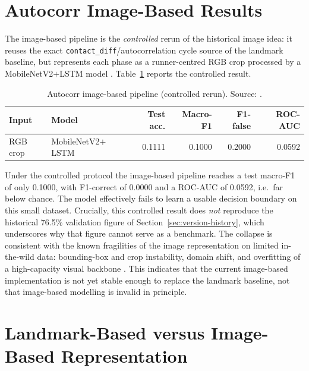 \section{Autocorr Image-Based Results}
\label{sec:image-results}

The image-based pipeline is the \emph{controlled} rerun of the historical
image idea: it reuses the exact \texttt{contact\_diff}/autocorrelation cycle
source of the landmark baseline, but represents each phase as a runner-centred
RGB crop processed by a MobileNetV2$+$LSTM model \cite{sandler2018mobilenetv2,hochreiter1997lstm,donahue2015lrcn}. Table~\ref{tab:image}
reports the controlled result.

\begin{table}[htbp]
\centering
\caption[Autocorr image-based pipeline results. Source: \protect{}.]{Autocorr image-based pipeline (controlled rerun). Source: .}
\label{tab:image}
\small
\begin{tabular}{llrrrr}
\toprule
Input & Model & Test acc. & Macro-F1 & F1-false & ROC-AUC \\
\midrule
RGB crop & MobileNetV2$+$LSTM & 0.1111 & 0.1000 & 0.2000 & 0.0592 \\
\bottomrule
\end{tabular}
\end{table}

Under the controlled protocol the image-based pipeline reaches a test macro-F1
of only 0.1000, with F1-correct of 0.0000 and a ROC-AUC of 0.0592, i.e.\ far
below chance. The model effectively fails to learn a usable decision boundary
on this small dataset. Crucially, this controlled result does \emph{not}
reproduce the historical 76.5\% validation figure of
Section~\ref{sec:version-history}, which underscores why that figure cannot
serve as a benchmark. The collapse is consistent with the known fragilities of
the image representation on limited in-the-wild data: bounding-box and crop
instability, domain shift, and overfitting of a high-capacity visual backbone \cite{sandler2018mobilenetv2}.
This indicates that the current image-based implementation
is not yet stable enough to replace the landmark baseline, not that image-based
modelling is invalid in principle.

\section{Landmark-Based versus Image-Based Representation}
\label{sec:representation}

